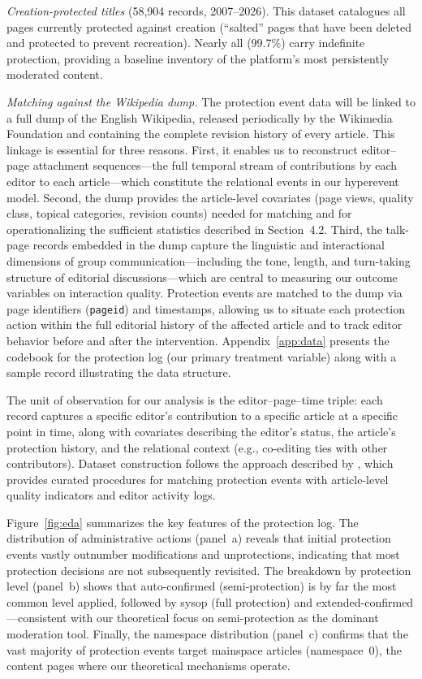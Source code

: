 \documentclass[11pt]{article}
\begin{document}
\emph{Creation-protected titles} (58,904 records, 2007--2026). This dataset catalogues all pages currently protected against creation (``salted'' pages that have been deleted and protected to prevent recreation). Nearly all (99.7\%) carry indefinite protection, providing a baseline inventory of the platform's most persistently moderated content.

\emph{Matching against the Wikipedia dump.} The protection event data will be linked to a full dump of the English Wikipedia, released periodically by the Wikimedia Foundation and containing the complete revision history of every article. This linkage is essential for three reasons. First, it enables us to reconstruct editor--page attachment sequences---the full temporal stream of contributions by each editor to each article---which constitute the relational events in our hyperevent model. Second, the dump provides the article-level covariates (page views, quality class, topical categories, revision counts) needed for matching and for operationalizing the sufficient statistics described in Section~4.2. Third, the talk-page records embedded in the dump capture the linguistic and interactional dimensions of group communication---including the tone, length, and turn-taking structure of editorial discussions---which are central to measuring our outcome variables on interaction quality. Protection events are matched to the dump via page identifiers (\texttt{pageid}) and timestamps, allowing us to situate each protection action within the full editorial history of the affected article and to track editor behavior before and after the intervention. Appendix~\ref{app:data} presents the codebook for the protection log (our primary treatment variable) along with a sample record illustrating the data structure.

The unit of observation for our analysis is the editor--page--time triple: each record captures a specific editor's contribution to a specific article at a specific point in time, along with covariates describing the editor's status, the article's protection history, and the relational context (e.g., co-editing ties with other contributors). Dataset construction follows the approach described by \citet{Ruprechter2025}, which provides curated procedures for matching protection events with article-level quality indicators and editor activity logs.

Figure~\ref{fig:eda} summarizes the key features of the protection log. The distribution of administrative actions (panel~a) reveals that initial protection events vastly outnumber modifications and unprotections, indicating that most protection decisions are not subsequently revisited. The breakdown by protection level (panel~b) shows that auto-confirmed (semi-protection) is by far the most common level applied, followed by sysop (full protection) and extended-confirmed---consistent with our theoretical focus on semi-protection as the dominant moderation tool. Finally, the namespace distribution (panel~c) confirms that the vast majority of protection events target mainspace articles (namespace~0), the content pages where our theoretical mechanisms operate.
\end{document}
